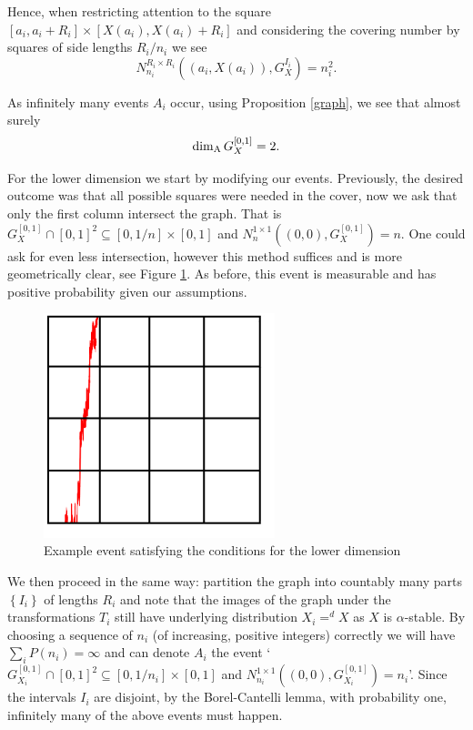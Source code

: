 Hence, when restricting attention to the square $[a_i, a_i + R_i] \times [X(a_i), X(a_i)+R_i]$ and considering the covering number by squares of side lengths $R_i/n_i$ we see
\[
N_{n_i}^{R_i \times R_i }\left((a_i,X(a_i)),G_{X}^{I_i}\right)=n_i^2.
\]

As infinitely many events $A_i$ occur, using Proposition \ref{graph}, we see that almost surely
\[
\dim_{\textup{A}} G_{X}^{[0,1]}=2.
\]



For the lower dimension we start by modifying our events. Previously, the desired outcome was that all possible squares were needed in the cover, now we ask that only the first column intersect the graph. That is $G_{X}^{[0,1]} \cap [0,1]^2 \subseteq [0,1/n] \times [0,1]$ and $N_{n}^{1\times 1}((0,0),G_X^{[0,1]}) = n$. One could ask for even less intersection, however this method suffices and is more geometrically clear, see Figure \ref{fig:rectangles-graph2}. As before, this event is measurable and has positive probability given our assumptions.

\begin{figure}[h]
    \centering
    \includegraphics[width=0.6\textwidth]{pics/ch-brownian/rectangles-graph2.png}
    \caption{Example event satisfying the conditions for the lower dimension}
    \label{fig:rectangles-graph2}
\end{figure}


We then proceed in the same way: partition the graph into countably many parts $\left\{I_i \right\}$ of lengths $R_i$ and note that the images of the graph under the transformations $T_i$ still have underlying distribution $X_i =^d X$ as $X$ is $\alpha$-stable. By choosing a sequence of $n_i$ (of increasing, positive integers) correctly we will have $\sum_{i}P(n_i) = \infty$ and can denote $A_i$ the event `$G_{X_i}^{[0,1]} \cap [0,1]^2 \subseteq [0,1/n_i] \times [0,1]$ and $N_{n_i}^{1\times 1}((0,0),G_{X_i}^{[0,1]}) = n_i$'. Since the intervals $I_i$ are disjoint, by the Borel-Cantelli lemma, with probability one, infinitely many of the above events must happen.

